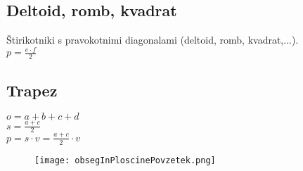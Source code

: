 \documentclass{article}
\begin{document}


\subsection{ Deltoid, romb, kvadrat }
Štirikotniki s pravokotnimi diagonalami (deltoid, romb, kvadrat,...). \\
$ p = \frac{e \cdot f}{2} $ 

\subsection{ Trapez }
$o = a + b + c + d$ \\
$s = \frac{a + c}{2}$ \\
$p = s \cdot v =  \frac{a + c}{2} \cdot v$


\pagebreak
\begin{figure}[h]
    \texttt{[image: obsegInPloscinePovzetek.png]}
    \centering
\end{figure}
\end{document}
